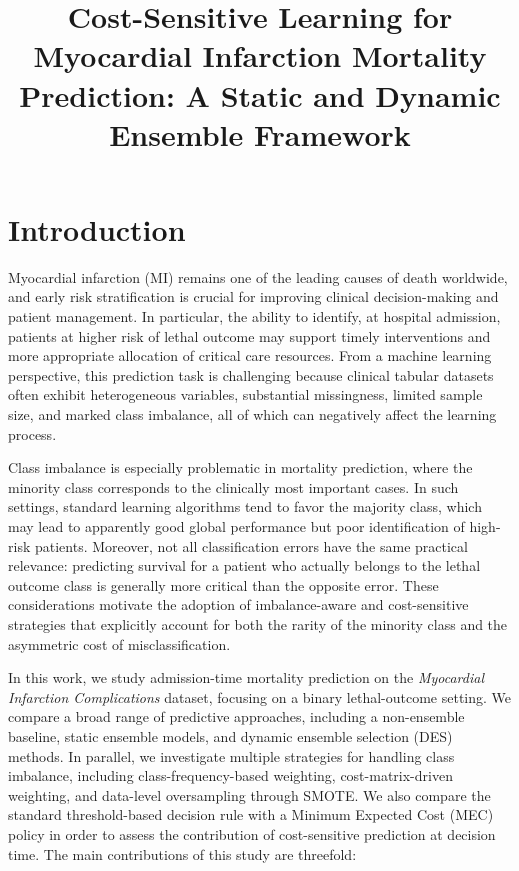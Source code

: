 \documentclass[conference]{IEEEtran}
\title{Cost-Sensitive Learning for Myocardial Infarction Mortality Prediction: A Static and Dynamic Ensemble Framework}
\author{
\IEEEauthorblockN{Leonardo Saccotelli}
\IEEEauthorblockA{
Università degli Studi di Bari Aldo Moro \\
Email: l.saccotelli@studenti.uniba.it
}
}
\begin{document}
\maketitle
\IEEEdisplaynontitleabstractindextext

\section{Introduction} 
Myocardial infarction (MI) remains one of the leading causes of death worldwide, and early risk stratification is crucial for improving clinical decision-making and patient management. In particular, the ability to identify, at hospital admission, patients at higher risk of lethal outcome may support timely interventions and more appropriate allocation of critical care resources. From a machine learning perspective, this prediction task is challenging because clinical tabular datasets often exhibit heterogeneous variables, substantial missingness, limited sample size, and marked class imbalance, all of which can negatively affect the learning process. 

Class imbalance is especially problematic in mortality prediction, where the minority class corresponds to the clinically most important cases. In such settings, standard learning algorithms tend to favor the majority class, which may lead to apparently good global performance but poor identification of high-risk patients. Moreover, not all classification errors have the same practical relevance: predicting survival for a patient who actually belongs to the lethal outcome class is generally more critical than the opposite error. These considerations motivate the adoption of imbalance-aware and cost-sensitive strategies that explicitly account for both the rarity of the minority class and the asymmetric cost of misclassification. 

In this work, we study admission-time mortality prediction on the \textit{Myocardial Infarction Complications} dataset, focusing on a binary lethal-outcome setting. We compare a broad range of predictive approaches, including a non-ensemble baseline, static ensemble models, and dynamic ensemble selection (DES) methods. In parallel, we investigate multiple strategies for handling class imbalance, including class-frequency-based weighting, cost-matrix-driven weighting, and data-level oversampling through SMOTE. We also compare the standard threshold-based decision rule with a Minimum Expected Cost (MEC) policy in order to assess the contribution of cost-sensitive prediction at decision time. 
The main contributions of this study are threefold:
\end{document}
